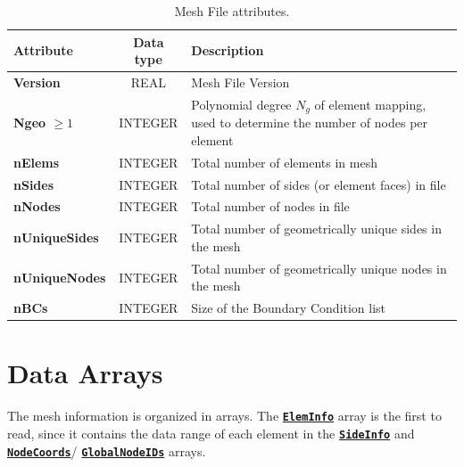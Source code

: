 \documentclass[a4paper,headsepline]{scrreprt}
\newcommand\Ngeo{N_g}
\newcommand\ttbf[1]{\texttt{\textbf{#1}}}
\newcommand\ElemInfo{\hyperlink{ElemInfo}{\ttbf{ElemInfo}}\xspace}
\newcommand\SideInfo{\hyperlink{SideInfo}{\ttbf{SideInfo}}\xspace}
\newcommand\NodeCoords{\hyperlink{NodeInfo}{\ttbf{NodeCoords}}\xspace}
\newcommand\GlobalNodeIDs{\hyperlink{NodeInfo}{\ttbf{GlobalNodeIDs}}\xspace}
\begin{document}
\begin{table}[h!]
\centering
\begin{tabularx}{1.0\textwidth}{|>{\bfseries\ttfamily}l|c|X|} \hline
\normalfont\textbf{Attribute}   & \textbf{Data type}  & \textbf{Description} \\ \hline\hline
Version       & REAL    & Mesh File Version \\\hline
Ngeo $\geq 1$ & INTEGER & Polynomial degree $\Ngeo$ of element mapping, used to determine the number of nodes per element \\\hline
nElems        & INTEGER & Total number of elements in mesh\\\hline
nSides        & INTEGER & Total number of sides (or element faces) in file\\\hline
nNodes        & INTEGER & Total number of nodes in file \\\hline
nUniqueSides  & INTEGER & Total number of geometrically unique sides in the mesh \\\hline
nUniqueNodes  & INTEGER & Total number of geometrically unique nodes in the mesh \\\hline
nBCs          & INTEGER & Size of the Boundary Condition list \\\hline
\end{tabularx}
\caption{Mesh File attributes.}
\end{table}

\clearpage
\section{Data Arrays}
The mesh information is organized in arrays. The \ElemInfo array is the first to read, since it contains the data range of each element in the \SideInfo and \NodeCoords / \GlobalNodeIDs arrays. 
\end{document}
